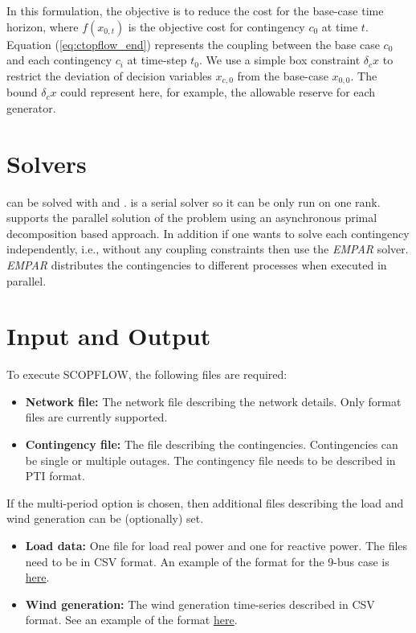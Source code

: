 In this formulation, the objective is to reduce the cost for the base-case time horizon, where $f(x_{0,t})$ is the objective cost for contingency $c_0$ at time $t$. Equation (\ref{eq:ctopflow_end}) represents the coupling between the base case $c_0$ and each contingency $c_i$ at time-step $t_0$. We use a simple box constraint $\delta_c{x}$ to restrict the  deviation of decision variables $x_{c,0}$ from the base-case $x_{0,0}$. The bound $\delta_c{x}$ could represent here, for example, the allowable reserve for each generator.

\section{Solvers}
\scopflow can be solved with \ipopt and \hiop. \ipopt is a serial solver so it can be only run on one rank. \hiop supports the parallel solution of the problem using an asynchronous primal decomposition based approach. In addition if one wants to solve each contingency independently, i.e., without any coupling constraints then use  the \emph{EMPAR} solver. \emph{EMPAR} distributes the contingencies to different processes when executed in parallel.

\section{Input and Output}
To execute SCOPFLOW, the following files are required:
\begin{itemize}
    \item \textbf{Network file:} The network file describing the network details. Only \matpower format files are currently supported.
    \item \textbf{Contingency file:} The file describing the contingencies. Contingencies can be single or multiple outages. The contingency file needs to be described in PTI format.
\end{itemize}
If the multi-period option is chosen, then additional files describing the load and wind generation can be (optionally) set.
\begin{itemize}
    \item \textbf{Load data:} One file for load real power and one for reactive power. The files need to be in CSV format. An example of the format for the 9-bus case is \href{https://gitlab.pnnl.gov/exasgd/frameworks/exago/-/tree/master/datafiles/case9}{here}.
    \item \textbf{Wind generation:} The wind generation time-series described in CSV format. See an example of the format \href{https://gitlab.pnnl.gov/exasgd/frameworks/exago/-/tree/master/datafiles/case9}{here}.
\end{itemize}

